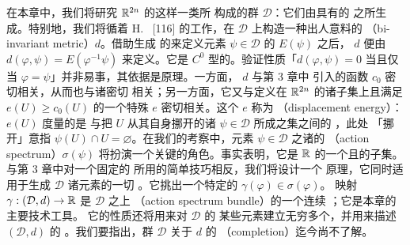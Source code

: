
在本章中，我们将研究 $\mathbb{R}^{2n}$ 的这样一类\trSymplecticDiffeomorphism{}所%
构成的群 $\mathcal{D}$：它们由具有\trCompactSupport{}的\trHamiltonianFunction{}%
之\trTimeDependent\trHamiltonianVectorField{}所生成。特别地，我们将循着%
H.~\trHofer{} [116] 的工作，在 $\mathcal{D}$ 上构造一种出人意料的%
\textbf{\trBiInvariantMetric{}}（bi-invariant metric）$d$。借助生成%
\trHamiltonianFunction{}的\trOscillation{}来定义元素 $\psi\in\mathcal{D}$ 的%
\trEnergy{} $E(\psi)$ 之后，\trMetric{} $d$ 便由 $d(\varphi,\psi)=E(\varphi^{-1}\psi)$%
来定义。它是 $C^{0}$ 型的。验证性质「$d(\varphi,\psi)=0$ 当且仅当%
$\varphi=\psi$」并非易事，其依据是\trAction{}原理。一方面，\trMetric{} $d$%
与第 3 章中%
引入的\trCapacity{}函数 $c_{0}$ 密切相关，从而也与诸\trPeriodicOrbit{}密切%
相关；另一方面，它又与定义在 $\mathbb{R}^{2n}$ 的诸子集上且满足 $e(U)\geq c_{0}(U)$%
的一个特殊\trCapacity{} $e$ 密切相关。这个\trCapacity{} $e$ 称为%
\textbf{\trDisplacementEnergy{}}（displacement energy）：$e(U)$ 度量的是%
\trIdentityMap{}与把 $U$ 从其自身挪开的诸 $\psi\in\mathcal{D}$ 所成之集之间的%
\trDistance，此处%
「挪开」意指 $\psi(U)\cap U=\varnothing$。在我们的考察中，元素%
$\psi\in\mathcal{D}$ 之诸\trFixedPoint{}的\textbf{\trActionSpectrum{}}%
（action spectrum）$\sigma(\psi)$ 将扮演一个关键的角色。事实表明，它是 $\mathbb{R}$%
的一个\trCompact{}且\trNowhereDense{}的子集。与第 3 章中对一个固定的%
\trHamiltonianFunction{}所用的简单\trVariational{}技巧相反，我们将设计一个%
\trMinimax{}原理，它同时适用于生成 $\mathcal{D}$ 诸元素的一切%
\trHamiltonianFunction。它挑出一个特定的\trAction{} $\gamma(\varphi)\in\sigma(\varphi)$。%
映射 $\gamma:(\mathcal{D},d)\to\mathbb{R}$ 是 $\mathcal{D}$ 之上%
\textbf{\trActionSpectrum{}\trBundle{}}（action spectrum bundle）的一个连续%
\trSection{}；它是本章的主要技术工具。
它的性质还将用来对 $\mathcal{D}$ 的%
某些元素建立无穷多个\trPeriodicOrbit，并用来描述 $(\mathcal{D},d)$ 的%
\trGeodesic。我们要指出，群 $\mathcal{D}$ 关于\trMetric{} $d$ 的\textbf{\trCompletion}%
（completion）迄今尚不了解。
